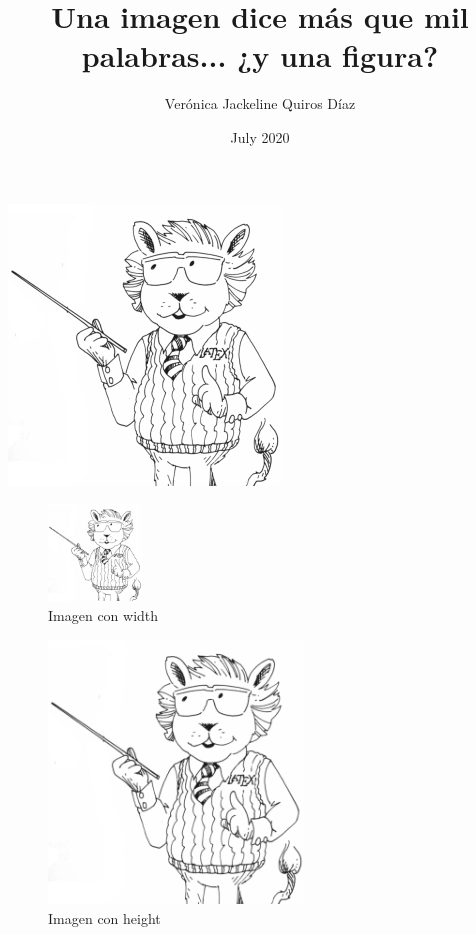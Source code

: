 \documentclass{article}
\title{\textbf{Una imagen dice más que mil palabras... ¿y una figura?}}
\author{Verónica Jackeline Quiros Díaz}
\date{July 2020}
\begin{document}
\maketitle
\centering \listoffigures
\begin{center}
    \includegraphics{images/latexlion2.png}
\end{center}
\newpage
\begin{figure}[H]
    \centering
    \includegraphics[width=2.5cm]{images/latexlion2.png}
    \caption{Imagen con width}
    \label{fig:my_label}
\end{figure}
\begin{figure}[H]
    \centering
    \includegraphics[height=7cm]{images/latexlion2.png}
    \caption{Imagen con height}
    \label{fig:my_label2}
\end{figure}
\end{document}
